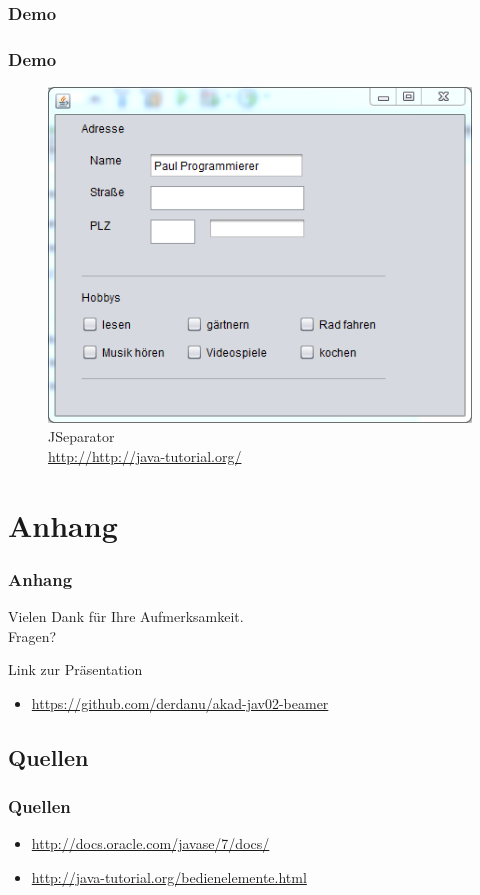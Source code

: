\documentclass[xcolor=dvipsnames]{beamer}
\begin{document}
\subsubsection{Demo}
\begin{frame}
  \frametitle{Demo}
	\begin{figure}
		\includegraphics[scale=0.6]{images/jseparator.PNG}
		\caption{JSeparator \\ \tiny{\textcolor{gray}{\url{http://http://java-tutorial.org/}}}}
		\end{figure}
\end{frame}

\section{Anhang}
\begin{frame}
  \frametitle{Anhang} %
	\begin{block}{}	
		\begin{center}
			Vielen Dank für Ihre Aufmerksamkeit. \\
			Fragen?
		\end{center}	
	\end{block}
	\begin{block}{Link zur Präsentation}	
		\begin{itemize}
			\item \url{https://github.com/derdanu/akad-jav02-beamer}
		\end{itemize}
	\end{block}
\end{frame}

\subsection{Quellen}
\begin{frame} %
  \frametitle{Quellen} %
 	\begin{itemize}
		\item \url{http://docs.oracle.com/javase/7/docs/}	
		\item \url{http://java-tutorial.org/bedienelemente.html}
	\end{itemize}
\end{frame}
\end{document}
